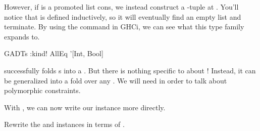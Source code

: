 \documentclass[book.tex]{subfiles}
\begin{document}
However, if  is a promoted list cons, we instead construct a
-tuple at . You'll notice that  is defined
inductively, so it will eventually find an empty list and terminate. By using
the  command in GHCi, we can see what this type family expands
to.

\begin{dorepl}{GADTs}
:kind! AllEq '[Int, Bool]
\end{dorepl}

 successfully folds \kind{[Type]}s into a . But there
is nothing specific to  about ! Instead, it can be generalized
into a fold over any  . We will need
 in order to talk about polymorphic constraints.


With , we can now write our  instance more directly.


\begin{exercise}
Rewrite the  and  instances in terms of .
\end{exercise}
\begin{solution}
\end{solution}
\end{document}
